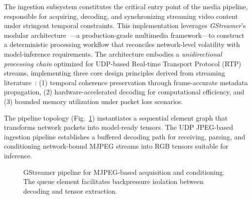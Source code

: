 The ingestion subsystem constitutes the critical entry point of the media pipeline, responsible for acquiring, decoding, and synchronizing streaming video content under stringent temporal constraints. This implementation leverages \textit{GStreamer}'s modular architecture~\cite{gstreamer1999}—a production-grade multimedia framework—to construct a deterministic processing workflow that reconciles network-level volatility with model-inference requirements. The architecture embodies a \textit{unidirectional processing chain} optimized for UDP-based Real-time Transport Protocol (RTP) streams, implementing three core design principles derived from streaming literature~\cite{BAMPIS2018218, jia2024continuous}: (1) temporal coherence preservation through frame-accurate metadata propagation, (2) hardware-accelerated decoding for computational efficiency, and (3) bounded memory utilization under packet loss scenarios.

The pipeline topology (Fig.~\ref{fig:pipeline_architecture}) instantiates a sequential element graph that transforms network packets into model-ready tensors. The UDP JPEG-based ingestion pipeline establishes a buffered decoding path for receiving, parsing, and conditioning network-bound MJPEG streams into RGB tensors suitable for inference.

\begin{figure}[h]
\centering
{}
\caption{GStreamer pipeline for MJPEG-based acquisition and conditioning. The queue element facilitates backpressure isolation between decoding and tensor extraction.}
\label{fig:pipeline_architecture}
\end{figure}

